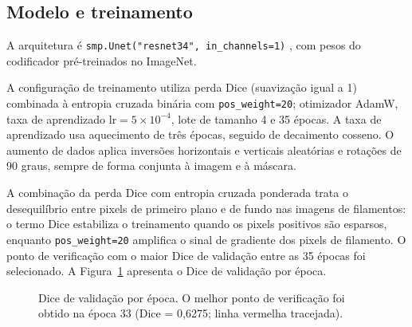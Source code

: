 \documentclass[
  article,
  11pt,
  oneside,
  a4paper,
  english,
  brazil,
  sumario=tradicional
]{abntex2}
\begin{document}
\subsection{Modelo e treinamento}

A arquitetura é \texttt{smp.Unet("resnet34", in\_channels=1)} \cite{ronneberger2015unet,he2016resnet}, com pesos do codificador pré-treinados no ImageNet.

A configuração de treinamento utiliza perda Dice (suavização igual a 1) combinada à entropia cruzada binária com \texttt{pos\_weight=20}; otimizador AdamW, taxa de aprendizado $\mathrm{lr}=5\times10^{-4}$, lote de tamanho 4 e 35 épocas. A taxa de aprendizado usa aquecimento de três épocas, seguido de decaimento cosseno. O aumento de dados aplica inversões horizontais e verticais aleatórias e rotações de 90 graus, sempre de forma conjunta à imagem e à máscara.

A combinação da perda Dice com entropia cruzada ponderada trata o desequilíbrio entre pixels de primeiro plano e de fundo nas imagens de filamentos: o termo Dice estabiliza o treinamento quando os pixels positivos são esparsos, enquanto \texttt{pos\_weight=20} amplifica o sinal de gradiente dos pixels de filamento. O ponto de verificação com o maior Dice de validação entre as 35 épocas foi selecionado. A Figura~\ref{fig:training} apresenta o Dice de validação por época.

\begin{figure}[htbp]
\centering
{}
\caption{Dice de validação por época. O melhor ponto de verificação foi obtido na época 33 (Dice = 0,6275; linha vermelha tracejada).}
\label{fig:training}
\par{}
\end{figure}
\end{document}
